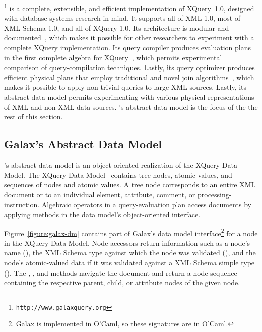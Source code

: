 \Galax{}\footnote{\texttt{http://www.galaxquery.org}} is a complete,
extensible, and efficient implementation of XQuery~1.0, designed with
database systems research in mind.  It supports all of XML 1.0, most
of XML Schema 1.0, and all of XQuery 1.0.  Its architecture is modular
and documented~\cite{galax:edbt2004}, which makes it possible for
other researchers to experiment with a complete XQuery implementation.
Its query compiler produces evaluation plans in the first complete
algebra for XQuery~\cite{galax:icde2006}, which permits experimental
comparison of query-compilation techniques.  Lastly, its query
optimizer produces efficient physical plans that employ traditional
and novel join algorithms~\cite{galax:icde2006}, which makes it
possible to apply non-trivial queries to large XML sources.  Lastly,
its abstract data model permits experimenting with various physical
representations of XML and non-XML data sources.  \Galax{}'s abstract data
model is the focus of the the rest of this section.

\subsection{Galax's Abstract Data Model}

\Galax{}'s abstract data model is an object-oriented realization of
the XQuery Data Model.  The XQuery Data Model~\cite{XPath:DataModel}
contains tree nodes, atomic values, and sequences of nodes and atomic
values.  A tree node corresponds to an entire XML document or to an
individual element, attribute, comment, or processing-instruction.
Algebraic operators in a query-evaluation plan access documents by
applying methods in the data model's object-oriented interface.

Figure~\ref{figure:galax-dm} contains part of Galax's data model
interface\footnote{Galax is implemented in O'Caml, so these signatures
are in O'Caml.} for a node in the XQuery Data Model.  Node
accessors return information such as a node's name (),
the XML Schema type against which the node was validated (),
and the node's atomic-valued data if it was validated against a XML
Schema simple type ().  The , ,
and  methods navigate the document and return a node
sequence containing the respective parent, child, or attribute nodes
of the given node.

